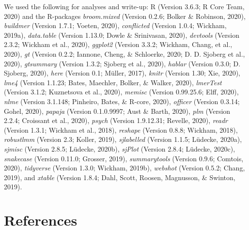 \documentclass[
  english,
  man, noextraspace,floatsintext]{apa6}
\begin{document}
We used the following for analyses and write-up: R (Version 3.6.3; R Core Team, 2020) and the R-packages \emph{broom.mixed} (Version 0.2.6; Bolker \& Robinson, 2020), \emph{buildmer} (Version 1.7.1; Voeten, 2020), \emph{conflicted} (Version 1.0.4; Wickham, 2019a), \emph{data.table} (Version 1.13.0; Dowle \& Srinivasan, 2020), \emph{devtools} (Version 2.3.2; Wickham et al., 2020), \emph{ggplot2} (Version 3.3.2; Wickham, Chang, et al., 2020), \emph{gt} (Version 0.2.2; Iannone, Cheng, \& Schloerke, 2020; D. D. Sjoberg et al., 2020), \emph{gtsummary} (Version 1.3.2; Sjoberg et al., 2020), \emph{hablar} (Version 0.3.0; D. Sjoberg, 2020), \emph{here} (Version 0.1; Müller, 2017), \emph{knitr} (Version 1.30; Xie, 2020), \emph{lme4} (Version 1.1.23; Bates, Maechler, Bolker, \& Walker, 2020), \emph{lmerTest} (Version 3.1.2; Kuznetsova et al., 2020), \emph{memisc} (Version 0.99.25.6; Elff, 2020), \emph{nlme} (Version 3.1.148; Pinheiro, Bates, \& R-core, 2020), \emph{officer} (Version 0.3.14; Gohel, 2020), \emph{papaja} (Version 0.1.0.9997; Aust \& Barth, 2020), \emph{plm} (Version 2.2.4; Croissant et al., 2020), \emph{psych} (Version 1.9.12.31; Revelle, 2020), \emph{readr} (Version 1.3.1; Wickham et al., 2018), \emph{reshape} (Version 0.8.8; Wickham, 2018), \emph{robustlmm} (Version 2.3; Koller, 2019), \emph{sjlabelled} (Version 1.1.5; Lüdecke, 2020a), \emph{sjmisc} (Version 2.8.5; Lüdecke, 2020b), \emph{sjPlot} (Version 2.8.4; Lüdecke, 2020c), \emph{snakecase} (Version 0.11.0; Grosser, 2019), \emph{summarytools} (Version 0.9.6; Comtois, 2020), \emph{tidyverse} (Version 1.3.0; Wickham, 2019b), \emph{webshot} (Version 0.5.2; Chang, 2019), and \emph{xtable} (Version 1.8.4; Dahl, Scott, Roosen, Magnusson, \& Swinton, 2019).

\newpage

\hypertarget{references}{%
\section{References}\label{references}}

\begingroup
\setlength{\parindent}{-0.5in}
\setlength{\leftskip}{0.5in}
\end{document}
